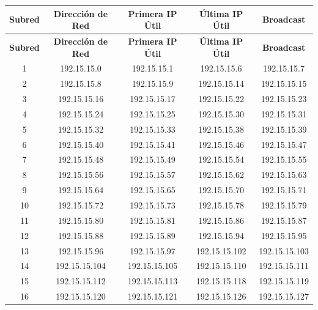 \documentclass[letterpaper,12pt]{article}
\begin{document}
    \begin{longtable}{|c|c|c|c|c|}
    \hline
    \textbf{Subred} & \textbf{Dirección de Red} & \textbf{Primera IP Útil} & \textbf{Última IP Útil} & \textbf{Broadcast} \\ \hline
    \endfirsthead

    \hline
    \textbf{Subred} & \textbf{Dirección de Red} & \textbf{Primera IP Útil} & \textbf{Última IP Útil} & \textbf{Broadcast} \\ \hline
    \endhead

    \endfoot

    \hline
    \endlastfoot

        1 & 192.15.15.0 & 192.15.15.1 & 192.15.15.6 & 192.15.15.7 \\ \hline
        2 & 192.15.15.8 & 192.15.15.9 & 192.15.15.14 & 192.15.15.15 \\ \hline
        3 & 192.15.15.16 & 192.15.15.17 & 192.15.15.22 & 192.15.15.23 \\ \hline
        4 & 192.15.15.24 & 192.15.15.25 & 192.15.15.30 & 192.15.15.31 \\ \hline
        5 & 192.15.15.32 & 192.15.15.33 & 192.15.15.38 & 192.15.15.39 \\ \hline
        6 & 192.15.15.40 & 192.15.15.41 & 192.15.15.46 & 192.15.15.47 \\ \hline
        7 & 192.15.15.48 & 192.15.15.49 & 192.15.15.54 & 192.15.15.55 \\ \hline
        8 & 192.15.15.56 & 192.15.15.57 & 192.15.15.62 & 192.15.15.63 \\ \hline
        9 & 192.15.15.64 & 192.15.15.65 & 192.15.15.70 & 192.15.15.71 \\ \hline
        10 & 192.15.15.72 & 192.15.15.73 & 192.15.15.78 & 192.15.15.79 \\ \hline
        11 & 192.15.15.80 & 192.15.15.81 & 192.15.15.86 & 192.15.15.87 \\ \hline
        12 & 192.15.15.88 & 192.15.15.89 & 192.15.15.94 & 192.15.15.95 \\ \hline
        13 & 192.15.15.96 & 192.15.15.97 & 192.15.15.102 & 192.15.15.103 \\ \hline
        14 & 192.15.15.104 & 192.15.15.105 & 192.15.15.110 & 192.15.15.111 \\ \hline
        15 & 192.15.15.112 & 192.15.15.113 & 192.15.15.118 & 192.15.15.119 \\ \hline
        16 & 192.15.15.120 & 192.15.15.121 & 192.15.15.126 & 192.15.15.127 \\ \hline

\end{longtable}
\end{document}
